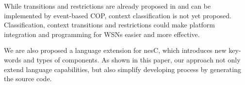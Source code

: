 \documentclass{ubicomp-ext}
\begin{document}
While transitions and restrictions are already proposed in \cite{kamina10} and can be implemented by event-based COP, context classification is not yet proposed. Classification, context transitions and restrictions could make platform integration and programming for WSNs easier and more effective.

We are also proposed a language extension for nesC, which introduces new key-words and types of components. As shown in this paper, our approach not only extend language capabilities, but also simplify developing process by generating the source code. 

\balance


\end{document}
